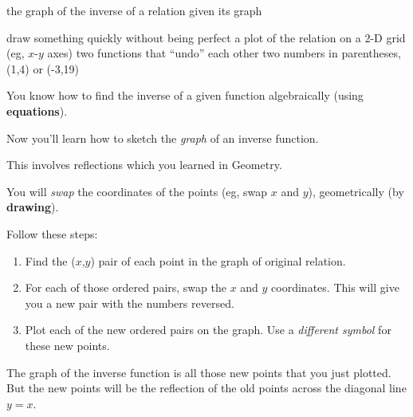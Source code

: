 \documentclass[fleqn,letterpaper,12pt,printwatermark=false]{memoir}
\begin{document}
\newcommand{\myClassName}{Pre-AP Algebra 2}
\newcommand{\myUnitNumber}{1}
\newcommand{\myUnitTitle}{Introduction to Functions}
\newcommand{\myLessonNumber}{99}
\newcommand{\myLessonTitle}{Sketching Inverses}


\pagestyle{myPagestyle}

\checkandfixthelayout
{}

\begin{myNotesHeader}
    \item {} the graph of the inverse of a relation given its graph
\end{myNotesHeader}

\begin{myVocabulary}
        {
            draw something quickly without being perfect
        }
        {
            a plot of the relation on a 2-D grid (eg, $x$-$y$ axes)
        }
        {
            two functions that ``undo'' each other
        }
        {
            two numbers in parentheses, (1,4) or (-3,19)
        }
\end{myVocabulary}

\begin{myLesson}
    \item 
    You know how to find the inverse of a given function
    algebraically (using {\bfseries equations}).
    \item
    Now you'll learn how to sketch the \emph{graph} of an inverse function.
    \item 
    This involves reflections which you learned in Geometry.
    \item
    You will \emph{swap} the coordinates of the points (eg, swap $x$ and $y$),
    geometrically (by {\bfseries drawing}).
\end{myLesson}

\begin{myKeyConcepts}
    Follow these steps:
    \begin{enumerate}
        \item Find the ($x$,$y$) pair of each point 
        in the graph of original relation.
        \item For each of those ordered pairs, 
        swap the $x$ and $y$ coordinates.
        This will give you a new pair with the numbers reversed.
        \item Plot each of the new ordered pairs on the graph.
        Use a \emph{different symbol} for these new points.
    \end{enumerate}
    The graph of the inverse function is all those new points 
    that you just plotted. But the new points will be the reflection 
    of the old points across the diagonal line $y=x$.
\end{myKeyConcepts}
\end{document}
